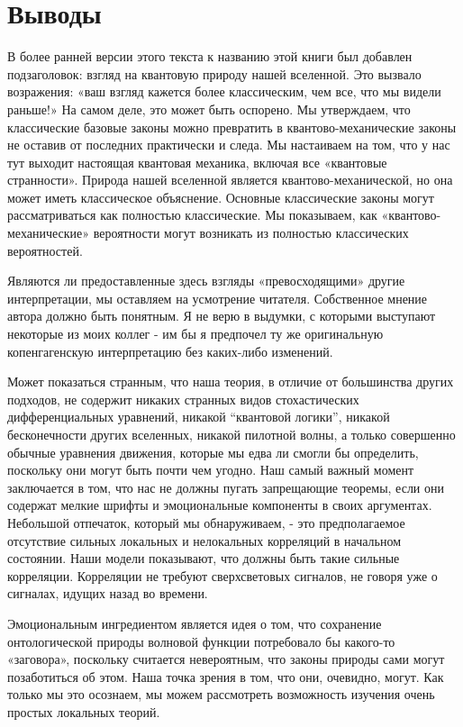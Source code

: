 \documentclass[main.tex]{subfiles}
\begin{document}
\section{Выводы}\label{ch10}

В более ранней версии этого текста к названию этой книги был добавлен подзаголовок: взгляд на квантовую природу нашей вселенной. Это вызвало возражения: «ваш взгляд кажется более классическим, чем все, что мы видели раньше!» На самом деле, это может быть оспорено. Мы утверждаем, что классические базовые законы можно превратить в квантово-механические законы не оставив от последних практически и следа. Мы настаиваем на том, что у нас тут выходит настоящая квантовая механика, включая все «квантовые странности». Природа нашей вселенной является квантово-механической, но она может иметь классическое объяснение. Основные классические законы могут рассматриваться как полностью классические. Мы показываем, как «квантово-механические» вероятности могут возникать из полностью классических вероятностей.

Являются ли предоставленные здесь взгляды «превосходящими» другие интерпретации, мы оставляем на усмотрение читателя. Собственное мнение автора должно быть понятным. Я не верю в выдумки, с которыми выступают некоторые из моих коллег - им бы я предпочел ту же оригинальную копенгагенскую интерпретацию без каких-либо изменений.

Может показаться странным, что наша теория, в отличие от большинства других подходов, не содержит никаких странных видов стохастических дифференциальных уравнений, никакой “квантовой логики”, никакой бесконечности других вселенных, никакой пилотной волны, а только совершенно обычные уравнения движения, которые мы едва ли смогли бы определить, поскольку они могут быть почти чем угодно. Наш самый важный момент заключается в том, что нас не должны пугать запрещающие теоремы, если они содержат мелкие шрифты и эмоциональные компоненты в своих аргументах. Небольшой отпечаток, который мы обнаруживаем, - это предполагаемое отсутствие сильных локальных и нелокальных корреляций в начальном состоянии. Наши модели показывают, что должны быть такие сильные корреляции. Корреляции не требуют сверхсветовых сигналов, не говоря уже о сигналах, идущих назад во времени.

Эмоциональным ингредиентом является идея о том, что сохранение онтологической природы волновой функции потребовало бы какого-то «заговора», поскольку считается невероятным, что законы природы сами могут позаботиться об этом. Наша точка зрения в том, что они, очевидно, могут. Как только мы это осознаем, мы можем рассмотреть возможность изучения очень простых локальных теорий.
\end{document}
